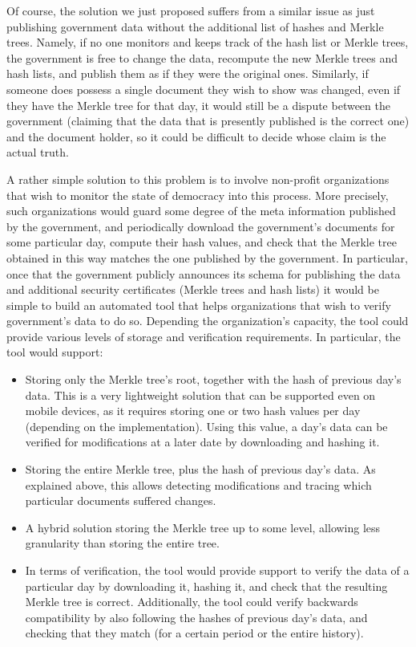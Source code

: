 \medskip
{} Of course, the solution we just proposed suffers from a similar issue as just publishing government data without the additional list of hashes and Merkle trees. Namely, if no one monitors and keeps track of the hash list or Merkle trees, the government is free to change the data, recompute the new Merkle trees and hash lists, and publish them as if they were the original ones. Similarly, if someone does possess a single document they wish to show was changed, even if they have the Merkle tree for that day, it would still be a dispute between the government (claiming that the data that is presently published is the correct one) and the document holder, so it could be difficult to decide whose claim is the actual truth.

A rather simple solution to this problem is to involve non-profit organizations that wish to monitor the state of democracy into this process. More precisely, such organizations would guard some degree of the meta information published by the government, and periodically download the government's documents for some particular day, compute their hash values, and check that the Merkle tree obtained in this way matches the one published by the government. In particular, once that the government publicly announces its schema for publishing the data and additional security certificates (Merkle trees and hash lists) it would be simple to build an automated tool that helps organizations that wish to verify government's data to do so. Depending the organization's capacity, the tool could provide various levels of storage and verification requirements. In particular, the tool would support:
\begin{itemize}
\item Storing only the Merkle tree's root, together with the hash of previous day's data. This is a very lightweight solution that can be supported even on mobile devices, as it requires storing one or two hash values per day (depending on the implementation). Using this value, a day's data can be verified for modifications at a later date by downloading and hashing it.
\item Storing the entire Merkle tree, plus the hash of previous day's data. As explained above, this allows detecting modifications and tracing which particular documents suffered changes.
\item A hybrid solution storing the Merkle tree up to some level, allowing less granularity than storing the entire tree.
\item In terms of verification, the tool would provide support to verify the data of a particular day by downloading it, hashing it, and check that the resulting Merkle tree is correct. Additionally, the tool could verify backwards compatibility by also following the hashes of previous day's data, and checking that they match (for a certain period or the entire history).
\end{itemize}

